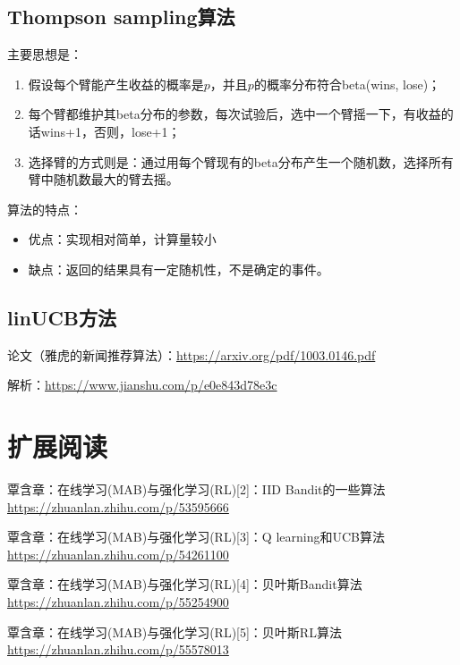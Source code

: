 \documentclass[12pt]{article}
\begin{document}
\subsection{Thompson sampling算法}
主要思想是：
\begin{enumerate}
\setlength{\itemsep}{0pt}
\setlength{\parsep}{0pt}
\setlength{\parskip}{0pt}
    \item 假设每个臂能产生收益的概率是$p$，并且$p$的概率分布符合beta(wins, lose)；
    \item 每个臂都维护其beta分布的参数，每次试验后，选中一个臂摇一下，有收益的话wins+1，否则，lose+1；
    \item 选择臂的方式则是：通过用每个臂现有的beta分布产生一个随机数，选择所有臂中随机数最大的臂去摇。
\end{enumerate}

算法的特点：
\begin{itemize}
\setlength{\itemsep}{0pt}
\setlength{\parsep}{0pt}
\setlength{\parskip}{0pt}
    \item 优点：实现相对简单，计算量较小
    \item 缺点：返回的结果具有一定随机性，不是确定的事件。
\end{itemize}

\subsection{linUCB方法}
论文（雅虎的新闻推荐算法）：\url{https://arxiv.org/pdf/1003.0146.pdf}

解析：\url{https://www.jianshu.com/p/e0e843d78e3c}



\section{扩展阅读}
覃含章：在线学习(MAB)与强化学习(RL)[2]：IID Bandit的一些算法
\url{https://zhuanlan.zhihu.com/p/53595666}

覃含章：在线学习(MAB)与强化学习(RL)[3]：Q learning和UCB算法
\url{https://zhuanlan.zhihu.com/p/54261100}

覃含章：在线学习(MAB)与强化学习(RL)[4]：贝叶斯Bandit算法
\url{https://zhuanlan.zhihu.com/p/55254900}

覃含章：在线学习(MAB)与强化学习(RL)[5]：贝叶斯RL算法
\url{https://zhuanlan.zhihu.com/p/55578013}




\end{document}
